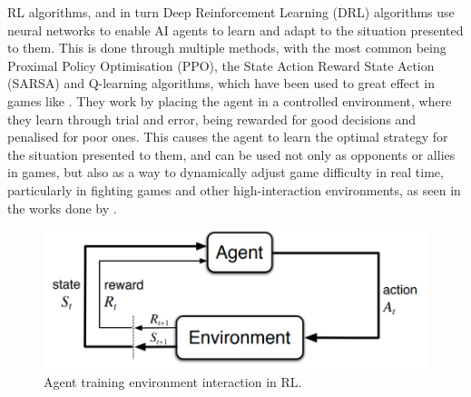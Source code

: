 \begin{spacing}{2.0}
	RL algorithms, and in turn Deep Reinforcement Learning (DRL) algorithms use neural networks to enable AI agents to learn and adapt to the situation presented to them. This is done through multiple methods, with the
	most common being Proximal Policy Optimisation (PPO), the State Action Reward State Action (SARSA) and Q-learning algorithms, which have been used to great effect in games like \cite{bin_ramlan_implementation_2021} \cite{metz_evaluation_2020}. They work by placing the agent in a controlled environment,
	where they learn through trial and error, being rewarded for good decisions and penalised for poor ones. This causes the agent to learn the optimal strategy for the situation presented to them,
	and can be used not only as opponents or allies in games, but also as a way to dynamically adjust game difficulty in real time, particularly in fighting games and other high-interaction environments,
	as seen in the works done by \cite{mercieca_evaluating_2023} \cite{mifsud_utilizing_2021} \cite{zheng_dynamic_2024}.

	\begin{figure}[ht]
		\centering
		\includegraphics[width=5in, fbox]{Figures/SarSa.png}
		\caption{Agent training environment interaction in RL. \cite{grech_creating_2023}}
		\label{fig:rl_training}
	\end{figure}



\end{spacing}
